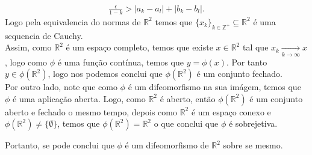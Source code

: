 \begin{homeworkProblem}[Seção 1-2]
\begin{solution}
\begin{itemize}
\begin{itemize}
            \begin{align*}
              \frac{\epsilon}{1-k}>\left| a_k-a_l \right|+\left|b_k-b_l\right|.
            \end{align*}
            Logo pela equivalencia do normas de $\mathbb{R}^{2}$ temos que $\{x_k\}_{k\in\mathbb{Z}^{+}}\subseteq\mathbb{R}^{2}$ é uma sequencia de Cauchy.\\
            Assim, como $\mathbb{R}^{2}$ é um espaço completo, temos que existe $x\in\mathbb{R}^{2}$ tal que $x_k\xrightarrow[k\to\infty]{}x$, logo como $\phi$ é uma função contínua, temos que $y=\phi(x)$. Por tanto $y\in\phi(\mathbb{R}^{2})$, logo nos podemos conclui que $\phi(\mathbb{R}^{2})$ é um conjunto fechado.\\
            
            Por outro lado, note que como $\phi$ é um difeomorfismo na sua imágem, temos que $\phi$ é uma aplicação aberta. Logo, como $\mathbb{R}^{2}$ é aberto, então $\phi(\mathbb{R}^{2})$ é um conjunto aberto e fechado o mesmo tempo, depois como $\mathbb{R}^{2}$ é um espaço conexo e $\phi(\mathbb{R}^{2})\neq\{\emptyset\}$, temos que $\phi(\mathbb{R}^{2})=\mathbb{R}^{2}$ o que conclui que $\phi$ é sobrejetiva.  
        \end{itemize}
        Portanto, se pode conclui que $\phi$ é um difeomorfismo de $\mathbb{R}^{2}$ sobre se mesmo. 
    \end{itemize}
  \end{solution}
\end{homeworkProblem}

